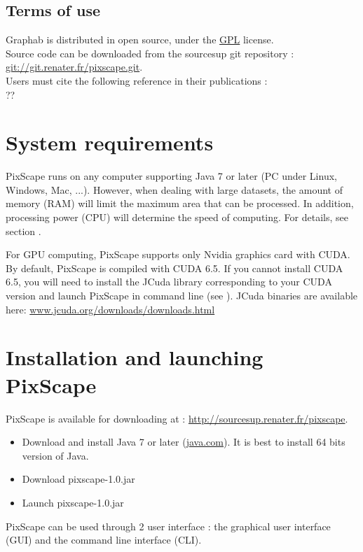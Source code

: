 \documentclass{report}
\begin{document}
\subsection{Terms of use}
Graphab is distributed in open source, under the \href{https://www.gnu.org/licenses/gpl-3.0.html}{GPL} license.\\
Source code can be downloaded from the sourcesup git repository : \url{git://git.renater.fr/pixscape.git}.\\
Users must cite the following reference in their publications :\\
??


\section{System requirements}

PixScape runs on any computer supporting Java 7 or later (PC under Linux, Windows, Mac, ...). 
However, when dealing with large datasets, the amount of memory (RAM) will limit the maximum area that can be processed. In addition, processing power (CPU) will determine the speed of computing. For details, see section .

For GPU computing, PixScape supports only Nvidia graphics card with CUDA. By default, PixScape is compiled with CUDA 6.5. If you cannot install CUDA 6.5, you will need to install the JCuda library corresponding to your CUDA version and launch PixScape in command line (see ). JCuda binaries are available here: \href{http://www.jcuda.org/downloads/downloads.html}{www.jcuda.org/downloads/downloads.html}

\section{Installation and launching PixScape}

PixScape is available for downloading at : \url{http://sourcesup.renater.fr/pixscape}.

\begin{itemize}
	\item Download and install Java 7 or later (\href{http://www.java.com}{java.com}). It is best to install 64 bits version of Java.
	\item Download pixscape-1.0.jar
	\item Launch pixscape-1.0.jar
\end{itemize}

PixScape can be used through 2 user interface : the graphical user interface (GUI) and the command line interface (CLI).
\end{document}
